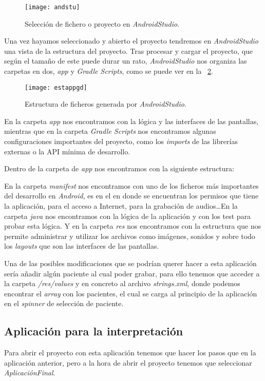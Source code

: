 \begin{figure}
	\centering
	\texttt{[image: andstu]}
	\caption{Selección de fichero o proyecto en \textit{AndroidStudio}.}
	\label{fig:andstu}
\end{figure}

Una vez hayamos seleccionado y abierto el proyecto tendremos en \textit{AndroidStudio} una vista de la estructura del proyecto. Tras procesar y cargar el proyecto, que según el tamaño de este puede durar un rato, \textit{AndroidStudio} nos organiza las carpetas en dos, \textit{app} y \textit{Gradle Scripts}, como se puede ver en la ~\ref{fig:estappgd}.

\begin{figure}
	\centering
	\texttt{[image: estappgd]}
	\caption{Estructura de ficheros generada por \textit{AndroidStudio}.}
	\label{fig:estappgd}
\end{figure}

En la carpeta \textit{app} nos encontramos con la lógica y las interfaces de las pantallas, mientras que en la carpeta \textit{Gradle Scripts} nos encontramos algunas configuraciones importantes del proyecto, como los \textit{imports} de las librerías externas o la API mínima de desarrollo.

Dentro de la carpeta de \textit{app} nos encontramos con la siguiente estructura:

En la carpeta \textit{manifest} nos encontramos con uno de los ficheros más importantes del desarrollo en \textit{Android}, es en el en donde se encuentran los permisos que tiene la aplicación, para el acceso a Internet, para la grabación de audios\ldots En la carpeta \textit{java} nos encontramos con la lógica de la aplicación y con los test para probar esta lógica. Y en la carpeta \textit{res} nos encontramos con la estructura que nos permite administrar y utilizar los archivos como imágenes, sonidos y sobre todo los \textit{layouts} que son las interfaces de las pantallas.

Una de las posibles modificaciones que se podrían querer hacer a esta aplicación sería añadir algún paciente al cual poder grabar, para ello tenemos que acceder a la carpeta \textit{/res/values} y en concreto al archivo \textit{strings.xml}, donde podemos encontrar el \textit{array} con los pacientes, el cual se carga al principio de la aplicación en el \textit{spinner} de selección de paciente.

\subsection{Aplicación para la interpretación}
Para abrir el proyecto con esta aplicación tenemos que hacer los pasos que en la aplicación anterior, pero a la hora de abrir el proyecto tenemos que seleccionar \textit{AplicaciónFinal}.


